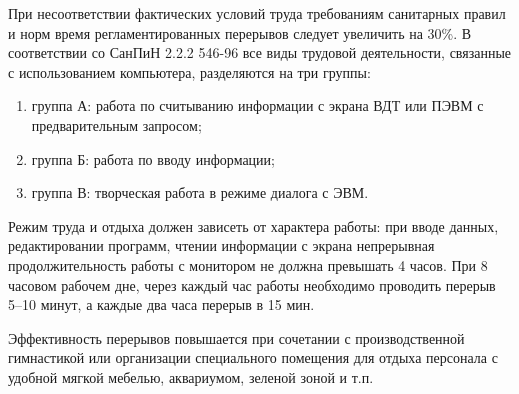 При несоответствии фактических условий труда требованиям санитарных правил и норм время регламентированных перерывов следует увеличить на 30\%. В соответствии со СанПиН 2.2.2 546-96 все виды трудовой деятельности, связанные с использованием компьютера, разделяются на три группы: 
\begin{enumerate}
	\item группа А: работа по считыванию информации с экрана ВДТ или ПЭВМ с предварительным запросом; 
	\item группа Б: работа по вводу информации; 
	\item группа В: творческая работа в режиме диалога с ЭВМ. 
\end{enumerate}

Режим труда и отдыха должен зависеть от характера работы: при вводе данных, редактировании программ, чтении информации с экрана непрерывная продолжительность работы с монитором не должна превышать 4 часов. При 8 часовом рабочем дне, через каждый час работы необходимо проводить перерыв 5--10 минут, а каждые два часа перерыв в 15 мин.

Эффективность перерывов повышается при сочетании с производственной гимнастикой или организации специального помещения для отдыха персонала с удобной мягкой мебелью, аквариумом, зеленой зоной и т.п.
